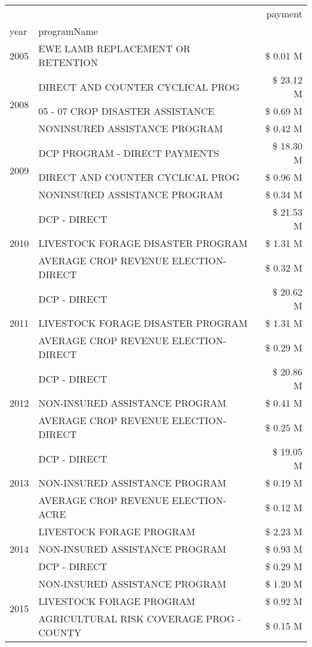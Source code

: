 \begin{tabular}{llr}
\toprule
 &  & payment \\
year & programName &  \\
\midrule
2005 & EWE LAMB REPLACEMENT OR RETENTION & \$ 0.01 M \\
\cline{1-3}
\multirow[t]{3}{*}{2008} & DIRECT AND COUNTER CYCLICAL PROG & \$ 23.12 M \\
 & 05 - 07 CROP DISASTER ASSISTANCE & \$ 0.69 M \\
 & NONINSURED ASSISTANCE PROGRAM & \$ 0.42 M \\
\cline{1-3}
\multirow[t]{3}{*}{2009} & DCP PROGRAM - DIRECT PAYMENTS & \$ 18.30 M \\
 & DIRECT AND COUNTER CYCLICAL PROG & \$ 0.96 M \\
 & NONINSURED ASSISTANCE PROGRAM & \$ 0.34 M \\
\cline{1-3}
\multirow[t]{3}{*}{2010} & DCP - DIRECT & \$ 21.53 M \\
 & LIVESTOCK FORAGE DISASTER PROGRAM & \$ 1.31 M \\
 & AVERAGE CROP REVENUE ELECTION-DIRECT & \$ 0.32 M \\
\cline{1-3}
\multirow[t]{3}{*}{2011} & DCP - DIRECT & \$ 20.62 M \\
 & LIVESTOCK FORAGE DISASTER PROGRAM & \$ 1.31 M \\
 & AVERAGE CROP REVENUE ELECTION-DIRECT & \$ 0.29 M \\
\cline{1-3}
\multirow[t]{3}{*}{2012} & DCP - DIRECT & \$ 20.86 M \\
 & NON-INSURED ASSISTANCE PROGRAM & \$ 0.41 M \\
 & AVERAGE CROP REVENUE ELECTION-DIRECT & \$ 0.25 M \\
\cline{1-3}
\multirow[t]{3}{*}{2013} & DCP - DIRECT & \$ 19.05 M \\
 & NON-INSURED ASSISTANCE PROGRAM & \$ 0.19 M \\
 & AVERAGE CROP REVENUE ELECTION-ACRE & \$ 0.12 M \\
\cline{1-3}
\multirow[t]{3}{*}{2014} & LIVESTOCK FORAGE PROGRAM & \$ 2.23 M \\
 & NON-INSURED ASSISTANCE PROGRAM & \$ 0.93 M \\
 & DCP - DIRECT & \$ 0.29 M \\
\cline{1-3}
\multirow[t]{3}{*}{2015} & NON-INSURED ASSISTANCE PROGRAM & \$ 1.20 M \\
 & LIVESTOCK FORAGE PROGRAM & \$ 0.92 M \\
 & AGRICULTURAL RISK COVERAGE PROG - COUNTY & \$ 0.15 M \\

\end{tabular}
